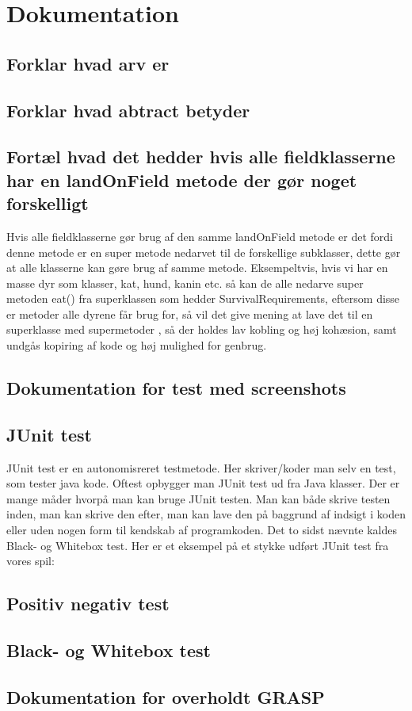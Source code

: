 \section{Dokumentation}
\subsection{Forklar hvad arv er}

\subsection{Forklar hvad abtract betyder}

\subsection{Fortæl hvad det hedder hvis alle fieldklasserne har en landOnField metode der gør noget forskelligt}
Hvis alle fieldklasserne gør brug af den samme landOnField metode er det fordi denne metode er en super metode nedarvet til de forskellige subklasser,
dette gør at alle klasserne kan gøre brug af samme metode. Eksempeltvis, hvis vi har en masse dyr som klasser, kat, hund, kanin etc. så kan de alle nedarve super metoden eat() fra 
superklassen som hedder SurvivalRequirements, eftersom disse er metoder alle dyrene får brug for, så vil det give mening at lave det til en superklasse med supermetoder
, så der holdes lav kobling og høj kohæsion, samt undgås kopiring af kode og høj mulighed for genbrug.
\subsection{Dokumentation for test med screenshots}
    \subsection{JUnit test}
        JUnit test er en autonomisreret testmetode. Her skriver/koder man selv en test, som tester java kode. Oftest opbygger man JUnit test ud fra Java klasser.
        Der er mange måder hvorpå man kan bruge JUnit testen. Man kan både skrive testen inden, man kan skrive den efter, man kan lave den på baggrund af indsigt i koden eller uden nogen form til kendskab af programkoden. Det to sidst nævnte kaldes Black- og Whitebox test.
        Her er et eksempel på et stykke udført JUnit test fra vores spil:
        
    \subsection{Positiv negativ test}

    \subsection{Black- og Whitebox test}

\subsection{Dokumentation for overholdt GRASP}
